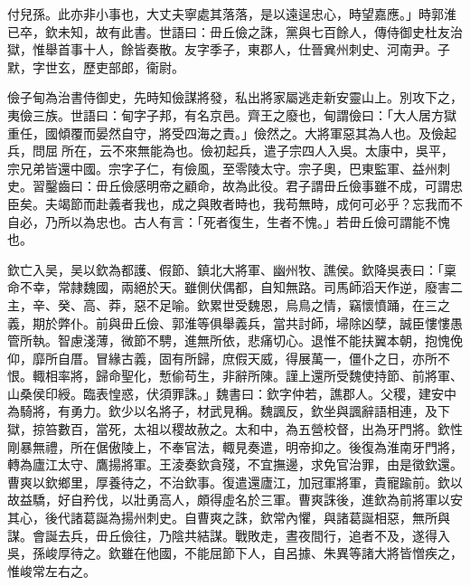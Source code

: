 \begin{pinyinscope}
付兒孫。此亦非小事也，大丈夫寧處其落落，是以遠逞忠心，時望嘉應。」時郭淮已卒，欽未知，故有此書。世語曰：毌丘儉之誅，黨與七百餘人，傳侍御史杜友治獄，惟舉首事十人，餘皆奏散。友字季子，東郡人，仕晉兾州刺史、河南尹。子默，字世玄，歷吏部郎，衞尉。

儉子甸為治書侍御史，先時知儉謀將發，私出將家屬逃走新安靈山上。別攻下之，夷儉三族。世語曰：甸字子邦，有名京邑。齊王之廢也，甸謂儉曰：「大人居方獄重任，國傾覆而晏然自守，將受四海之責。」儉然之。大將軍惡其為人也。及儉起兵，問屈𩑺所在，云不來無能為也。儉初起兵，遣子宗四人入吳。太康中，吳平，宗兄弟皆還中國。宗字子仁，有儉風，至零陵太守。宗子奧，巴東監軍、益州刺史。習鑿齒曰：毌丘儉感明帝之顧命，故為此役。君子謂毌丘儉事雖不成，可謂忠臣矣。夫竭節而赴義者我也，成之與敗者時也，我苟無時，成何可必乎？忘我而不自必，乃所以為忠也。古人有言：「死者復生，生者不愧。」若毌丘儉可謂能不愧也。

欽亡入吴，吴以欽為都護、假節、鎮北大將軍、幽州牧、譙侯。欽降吳表曰：「稟命不幸，常隷魏國，兩絕於天。雖側伏偶都，自知無路。司馬師滔天作逆，廢害二主，辛、癸、高、莽，惡不足喻。欽累世受魏恩，烏鳥之情，竊懷憤踊，在三之義，期於弊仆。前與毌丘儉、郭淮等俱舉義兵，當共討師，埽除凶孽，誠臣慺慺愚管所執。智慮淺薄，微節不騁，進無所依，悲痛切心。退惟不能扶翼本朝，抱愧俛仰，靡所自厝。冒緣古義，固有所歸，庶假天威，得展萬一，僵仆之日，亦所不恨。輙相率將，歸命聖化，慙偷苟生，非辭所陳。謹上還所受魏使持節、前將軍、山桑侯印綬。臨表惶惑，伏須罪誅。」魏書曰：欽字仲若，譙郡人。父稷，建安中為騎將，有勇力。欽少以名將子，材武見稱。魏諷反，欽坐與諷辭語相連，及下獄，掠笞數百，當死，太祖以稷故赦之。太和中，為五營校督，出為牙門將。欽性剛暴無禮，所在倨傲陵上，不奉官法，輙見奏遣，明帝抑之。後復為淮南牙門將，轉為廬江太守、鷹揚將軍。王淩奏欽貪殘，不宜撫邊，求免官治罪，由是徵欽還。曹爽以欽鄉里，厚養待之，不治欽事。復遣還廬江，加冠軍將軍，貴寵踰前。欽以故益驕，好自矜伐，以壯勇高人，頗得虛名於三軍。曹爽誅後，進欽為前將軍以安其心，後代諸葛誕為揚州刺史。自曹爽之誅，欽常內懼，與諸葛誕相惡，無所與謀。會誕去兵，毌丘儉往，乃陰共結謀。戰敗走，晝夜間行，追者不及，遂得入吳，孫峻厚待之。欽雖在他國，不能屈節下人，自呂據、朱異等諸大將皆憎疾之，惟峻常左右之。


\end{pinyinscope}